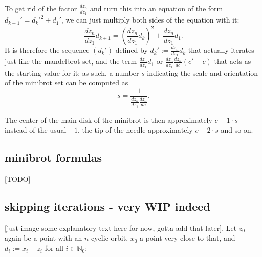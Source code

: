 \documentclass[12pt,a4paper]{article}
\begin{document}
To get rid of the factor $\frac{dz_n}{dz_1}$ and turn this into an equation of the form $d_{k+1}'=d_k'^2+d_1'$, we can just multiply both sides of the equation with it:
$$\frac{dz_n}{dz_1}d_{k+1}=\left(\frac{dz_n}{dz_1}d_k\right)^2+\frac{dz_n}{dz_1}d_1.$$
It is therefore the sequence $(d_k')$ defined by $d_k':=\frac{dz_n}{dz_1}d_k$ that actually iterates just like the mandelbrot set, and the term $\frac{dz_n}{dz_1}d_1$ or $\frac{dz_n}{dz_1}\frac{dz_n}{dc}(c'-c)$ that acts as the starting value for it; as such, a number $s$ indicating the scale and orientation of the minibrot set can be computed as $$s=\frac{1}{\frac{dz_n}{dz_1}\frac{dz_n}{dc}}.$$

The center of the main disk of the minibrot is then approximately $c-1\cdot s$ instead of the usual $-1$, the tip of the needle approximately $c-2\cdot s$ and so on.

\subsection{minibrot formulas}

[TODO]

\subsection{skipping iterations - very WIP indeed}


[just image some explanatory text here for now, gotta add that later]. Let $z_0$ again be a point with an $n$-cyclic orbit, $x_0$ a point very close to that, and $d_i:=x_i-z_i$ for all $i\in\mathbb{N}_0$:
\end{document}
